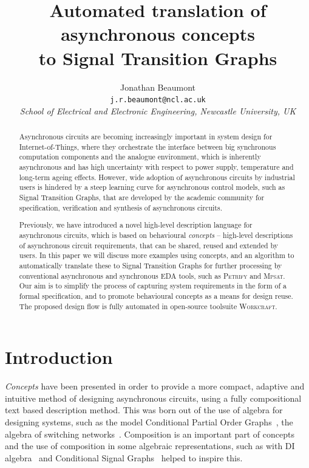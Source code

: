 \documentclass[british,conference,compsoc]{IEEEtran}
\newcommand{\noun}[1]{\textsc{#1}}
\begin{document}
\twocolumn

\title{Automated translation of asynchronous concepts \\
to Signal Transition Graphs}
\author{Jonathan Beaumont\\
\texttt{j.r.beaumont@ncl.ac.uk}\\
\emph{School of Electrical and Electronic Engineering, Newcastle University,
UK}}

\maketitle

\begin{abstract}
Asynchronous circuits are becoming increasingly important in
system design for Internet-of-Things, where they orchestrate
the interface between big synchronous computation components
and the analogue environment, which is inherently asynchronous
and has high uncertainty with respect to power supply,
temperature and long-term ageing effects.
However, wide adoption of asynchronous circuits by industrial users is
hindered by a steep learning curve for asynchronous control models,
such as Signal Transition Graphs, that are developed by the academic
community for specification, verification and synthesis of
asynchronous circuits.

Previously, we have introduced a novel high-level description language
for asynchronous circuits, which is based on behavioural
\textit{concepts} -- high-level descriptions of asynchronous circuit
requirements, that can be shared, reused and extended by users. 
In this paper we will discuss more examples using concepts, and an algorithm to
automatically translate these to Signal Transition Graphs for further processing
by conventional asynchronous and synchronous EDA tools, such as \noun{Petrify}
and \noun{Mpsat}. Our aim is to simplify the process of capturing system
requirements in the form of a formal specification, and to promote behavioural
concepts as a means for design reuse. The proposed design flow is fully
automated in open-source toolsuite \noun{Workcraft}.
\end{abstract}

\sloppy
\thispagestyle{empty}
\section{Introduction}

\emph{Concepts} have been presented in order to provide a more compact, adaptive and intuitive method of
designing asynchronous circuits, using a fully compositional text based description method. 
This was born out of the use of algebra for designing systems,
such as the model Conditional Partial Order Graphs~\cite{CPOG1}\cite{CPOG2}\cite{2014_mokhov_pg},
the algebra of switching networks~\cite{mokhov2015algebra}. Composition is an important part of concepts
 and the use of composition in some algebraic representations, such as with DI algebra~\cite{270632} 
 and Conditional Signal Graphs~\cite{6243877} helped to inspire this. 
\end{document}
